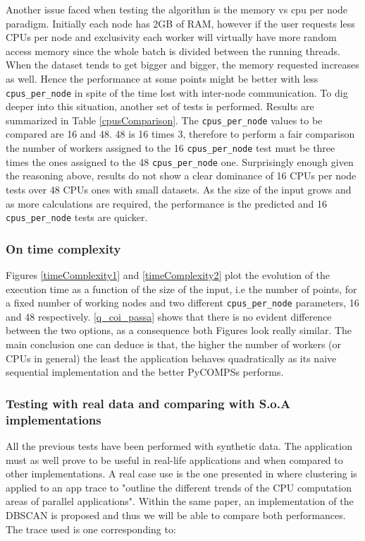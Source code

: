 \documentclass[10pt,journal,compsoc]{IEEEtran}
\begin{document}
Another issue faced when testing the algorithm is the memory vs cpu per node paradigm. Initially each node has 2GB of RAM, however if the user requests less CPUs per node and exclusivity each worker will virtually have more random access memory since the whole batch is divided between the running threads. When the dataset tends to get bigger and bigger, the memory requested increases as well. Hence the performance at some points might be better with less \texttt{cpus\_per\_node} in spite of the time lost with inter-node communication. To dig deeper into this situation, another set of tests is performed. Results are summarized in Table \ref{cpusComparison}. The \texttt{cpus\_per\_node} values to be compared are 16 and 48. 48 is 16 times 3, therefore to perform a fair comparison the number of workers assigned to the 16 \texttt{cpus\_per\_node} test must be three times the ones assigned to the 48 \texttt{cpus\_per\_node} one. Surprisingly enough given the reasoning above, results do not show a clear dominance of 16 CPUs per node tests over 48 CPUs ones with small datasets. As the size of the input grows and as more calculations are required, the performance is the predicted and 16 \texttt{cpus\_per\_node} tests are quicker.

\subsubsection{On time complexity}

Figures \ref{timeComplexity1} and \ref{timeComplexity2} plot the evolution of the execution time as a function of the size of the input, i.e the number of points, for a fixed number of working nodes and two different \texttt{cpus\_per\_node} parameters, 16 and 48 respectively. \ref{q_coi_passa} shows that there is no evident difference between the two options, as a consequence both Figures look really similar. The main conclusion one can deduce is that, the higher the number of workers (or CPUs in general) the least the application behaves quadratically as its naive sequential implementation and the better PyCOMPSs performs.

\subsubsection{Testing with real data and comparing with S.o.A implementations}

All the previous tests have been performed with synthetic data. The application must as well prove to be useful in real-life applications and when compared to other implementations. A real case use is the one presented in \cite{toolsDBSCAN} where clustering is applied to an app trace to "outline the different trends of the CPU computation areas of parallel applications". Within the same paper, an implementation of the DBSCAN is proposed and thus we will be able to compare both performances. The trace used is one corresponding to:
\end{document}
